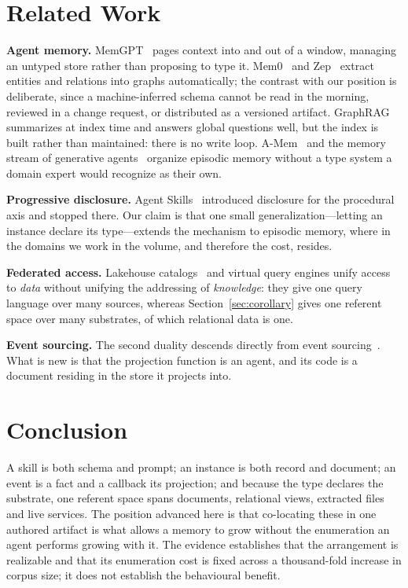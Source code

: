 \documentclass[journal,nofonttune]{IEEEtran}
\begin{document}
\section{Related Work}

\textbf{Agent memory.} MemGPT~\cite{memgpt} pages context into and out of a
window, managing an untyped store rather than proposing to type it.
Mem0~\cite{mem0} and Zep~\cite{zep} extract entities and relations into
graphs automatically; the contrast with our position is deliberate, since a
machine-inferred schema cannot be read in the morning, reviewed in a change
request, or distributed as a versioned artifact. GraphRAG~\cite{graphrag}
summarizes at index time and answers global questions well, but the index is
built rather than maintained: there is no write loop. A-Mem~\cite{amem} and
the memory stream of generative agents~\cite{genagents} organize episodic
memory without a type system a domain expert would recognize as their own.

\textbf{Progressive disclosure.} Agent Skills~\cite{agentskills} introduced
disclosure for the procedural axis and stopped there. Our claim is that one
small generalization---letting an instance declare its type---extends the
mechanism to episodic memory, where in the domains we work in the volume, and
therefore the cost, resides.

\textbf{Federated access.} Lakehouse catalogs~\cite{ducklake,iceberg} and
virtual query engines unify access to \emph{data} without unifying the
addressing of \emph{knowledge}: they give one query language over many
sources, whereas Section~\ref{sec:corollary} gives one referent space over
many substrates, of which relational data is one.

\textbf{Event sourcing.} The second duality descends directly from event
sourcing~\cite{eventsourcing}. What is new is that the projection function is
an agent, and its code is a document residing in the store it projects into.

\section{Conclusion}

A skill is both schema and prompt; an instance is both record and document;
an event is a fact and a callback its projection; and because the type
declares the substrate, one referent space spans documents, relational views,
extracted files and live services. The position advanced here is that co-locating these in one authored artifact
is what allows a memory to grow without the enumeration an agent performs
growing with it. The evidence establishes that the arrangement is realizable
and that its enumeration cost is fixed across a thousand-fold increase in
corpus size; it does not establish the behavioural benefit.
\end{document}
